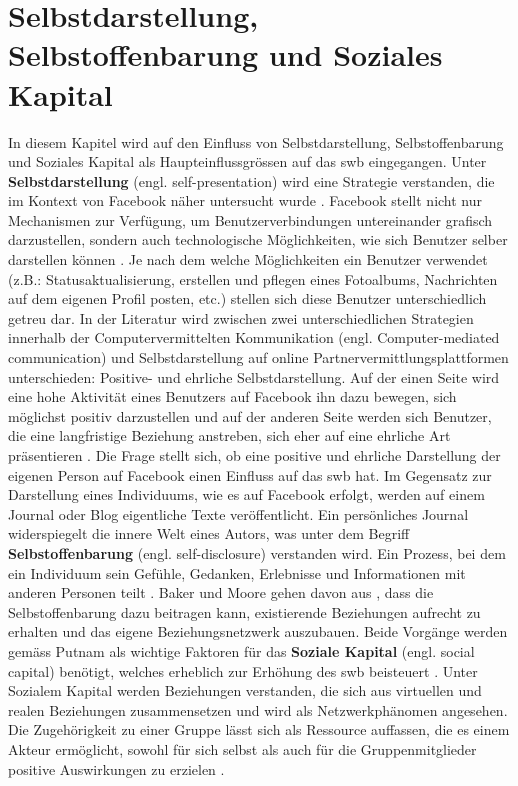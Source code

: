 \section{Selbstdarstellung, Selbstoffenbarung und Soziales Kapital}\label{sub.selfp}
In diesem Kapitel wird auf den Einfluss von Selbstdarstellung, Selbstoffenbarung und Soziales Kapital als Haupteinflussgrössen auf das \gls{swb} eingegangen. \newline
Unter \textbf{Selbstdarstellung} (engl. self-presentation) wird eine Strategie verstanden, die im Kontext von Facebook näher untersucht wurde \cite{Kim:2011}. Facebook stellt nicht nur Mechanismen zur Verfügung, um Benutzerverbindungen untereinander grafisch darzustellen, sondern auch technologische Möglichkeiten, wie sich Benutzer selber darstellen können \cite{Ellison:2007.1}. Je nach dem welche Möglichkeiten ein Benutzer verwendet (z.B.: Statusaktualisierung, erstellen und pflegen eines Fotoalbums, Nachrichten auf dem eigenen Profil posten, etc.) stellen sich diese Benutzer unterschiedlich getreu dar. In der Literatur wird zwischen zwei unterschiedlichen Strategien innerhalb der Computervermittelten Kommunikation (engl. Computer-mediated communication) \cite{Tidwell:2002} und Selbstdarstellung auf online Partnervermittlungsplattformen \cite{Gibbs:2006}  unterschieden: Positive- und ehrliche Selbstdarstellung. Auf der einen Seite wird eine hohe Aktivität eines Benutzers auf Facebook ihn dazu bewegen, sich möglichst positiv darzustellen \cite{Kimmerle:2008} und auf der anderen Seite werden sich Benutzer, die eine langfristige Beziehung anstreben, sich eher auf eine ehrliche Art präsentieren \cite{Gibbs:2006}. Die Frage stellt sich, ob eine positive und ehrliche Darstellung der eigenen Person auf Facebook einen Einfluss auf das \gls{swb} hat.\newline
Im Gegensatz zur Darstellung eines Individuums, wie es auf Facebook erfolgt, werden auf einem Journal oder Blog eigentliche Texte veröffentlicht. Ein persönliches Journal widerspiegelt die innere Welt eines Autors, was unter dem Begriff \textbf{Selbstoffenbarung} (engl. self-disclosure) verstanden wird. Ein Prozess, bei dem ein Individuum sein Gefühle, Gedanken, Erlebnisse und Informationen mit anderen Personen teilt \cite{Derlega:1993}. Baker und Moore gehen davon aus \cite{Baker:2008}, dass die Selbstoffenbarung dazu beitragen kann, existierende Beziehungen aufrecht zu erhalten und das eigene Beziehungsnetzwerk auszubauen. Beide Vorgänge werden gemäss Putnam \cite{Putnam:2000} als wichtige Faktoren für das \textbf{Soziale Kapital} (engl. social capital) benötigt, welches erheblich zur Erhöhung des \gls{swb} beisteuert \cite{Sirgy:2006}. Unter Sozialem Kapital werden Beziehungen verstanden, die sich aus virtuellen und realen Beziehungen zusammensetzen \cite{Ellison:2007} und wird als Netzwerkphänomen angesehen. Die Zugehörigkeit zu einer Gruppe lässt sich als Ressource auffassen, die es einem Akteur ermöglicht, sowohl für sich selbst als auch für die Gruppenmitglieder positive Auswirkungen zu erzielen \cite{Bourdieu:1983}.\newline
